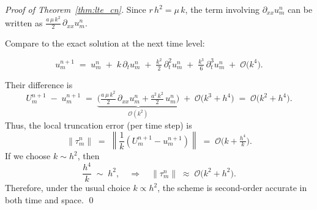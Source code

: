 \begin{proof}[Proof of Theorem~\ref{thm:lte_cn}]
  Since $r\,h^2 = \mu\,k$, the term involving $\partial_{xx} u_m^n$ can be written as
  $\tfrac{a\,\mu\,k^2}{2}\,\partial_{xx}u_m^n$.

  Compare to the exact solution at the next time level:

  \[
    u_m^{n+1}
    \;=\; u_m^n
    \;+\; k\,\partial_t u_m^n
    \;+\; \tfrac{k^2}{2}\,\partial_t^2 u_m^n
    \;+\; \tfrac{k^3}{6}\,\partial_t^3 u_m^n
    \;+\; \mathcal{O}\bigl(k^4\bigr).
  \]

  Their difference is
  \[
    U_m^{n+1} \;-\; u_m^{n+1}
    \;=\;
    \underbrace{\bigl(\tfrac{a\,\mu\,k^2}{2}\,\partial_{xx}u_m^n
      + \tfrac{a^2\,k^2}{2}\,u_m^n\bigr)}_{\mathcal{O}(k^2)}
    \;+\; \mathcal{O}\bigl(k^3 + h^4\bigr)
    \;=\; \mathcal{O}\bigl(k^2 + h^4\bigr).
  \]
  Thus, the local truncation error (per time step) is
  \[
    \lVert{\tau_m^n}\rVert
    \;=\; \left\lVert\dfrac{1}{k}\left(U_m^{n+1} - u_m^{n+1}\right) \right\rVert
    \;=\; \mathcal{O}\bigl(k + \tfrac{h^4}{k}\bigr).
  \]
  If we choose $k \sim h^2$, then
  \[
    \frac{h^4}{k} \;\sim\; h^2,
    \quad
    \Rightarrow
    \quad
    \lVert{\tau_m^n}\rVert \;\approx\; \mathcal{O}\bigl(k^2 + h^2\bigr).
  \]
  Therefore, under the usual choice $k \propto h^2$, the scheme is second-order accurate in both time and space. \qed
\end{proof}

